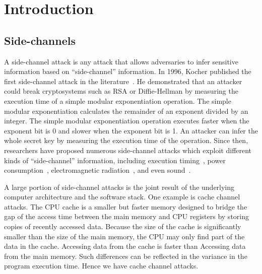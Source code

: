 
\chapter{Introduction} \label{chapter1}
\section{Side-channels}
A side-channel attack is any attack that allows adversaries to infer sensitive information based on ``side-channel'' information. In 1996, Kocher published the first side-channel attack in the literature~\cite{kocher1996timing}. He demonstrated that an attacker could break cryptosystems such as RSA or Diffie-Hellman by measuring the execution time of a simple modular exponentiation operation. The simple modular exponentiation calculates the remainder of an exponent divided by an integer.  The simple modular exponentiation operation executes faster when the exponent bit is 0 and slower when the exponent bit is 1. An attacker can infer the whole secret key by measuring the execution time of the operation. Since then, researchers have proposed numerous side-channel attacks which exploit different kinds of ``side-channel'' information, including execution timing~\cite{184415,disselkoen2017prime+}, power consumption~\cite{kar20178}, electromagnetic radiation~\cite{agrawal2002side,217605}, and even sound~\cite{chari1999towards}. 

A large portion of side-channel attacks is the joint result of the underlying computer architecture and the software stack.  One example is cache channel attacks. The CPU cache is a smaller but faster memory designed to bridge the gap of the access time between the main memory and CPU registers by storing copies of recently accessed data. Because the size of the cache is significantly smaller than the size of the main memory, the CPU may only find part of the data in the cache. Accessing data from the cache is faster than Accessing data from the main memory. Such differences can be reflected in the variance in the program execution time. Hence we have cache channel attacks.


